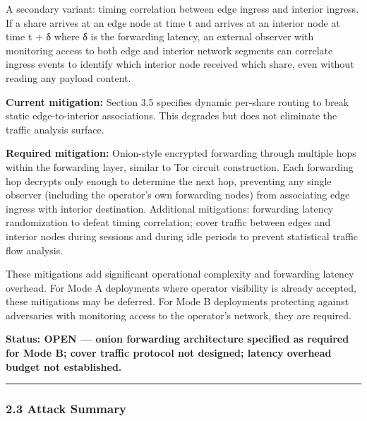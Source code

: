 \documentclass[
  11pt,
]{article}
\begin{document}
A secondary variant: timing correlation between edge ingress and
interior ingress. If a share arrives at an edge node at time t and
arrives at an interior node at time t + δ where δ is the forwarding
latency, an external observer with monitoring access to both edge and
interior network segments can correlate ingress events to identify which
interior node received which share, even without reading any payload
content.

\textbf{Current mitigation:} Section 3.5 specifies dynamic per-share
routing to break static edge-to-interior associations. This degrades but
does not eliminate the traffic analysis surface.

\textbf{Required mitigation:} Onion-style encrypted forwarding through
multiple hops within the forwarding layer, similar to Tor circuit
construction. Each forwarding hop decrypts only enough to determine the
next hop, preventing any single observer (including the operator's own
forwarding nodes) from associating edge ingress with interior
destination. Additional mitigations: forwarding latency randomization to
defeat timing correlation; cover traffic between edges and interior
nodes during sessions and during idle periods to prevent statistical
traffic flow analysis.

These mitigations add significant operational complexity and forwarding
latency overhead. For Mode A deployments where operator visibility is
already accepted, these mitigations may be deferred. For Mode B
deployments protecting against adversaries with monitoring access to the
operator's network, they are required.

\textbf{Status: OPEN --- onion forwarding architecture specified as
required for Mode B; cover traffic protocol not designed; latency
overhead budget not established.}

\begin{center}\rule{0.5\linewidth}{0.5pt}\end{center}

\hypertarget{attack-summary}{%
\subsubsection{2.3 Attack Summary}\label{attack-summary}}
\end{document}
